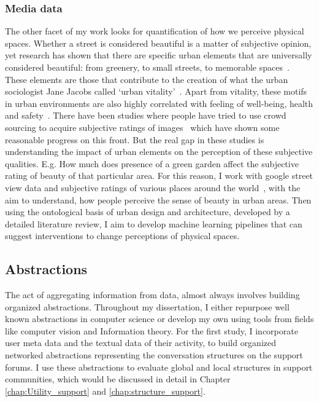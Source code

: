 \subsubsection{Media data}
The other facet of my work looks for quantification of how we perceive physical spaces. Whether a street is considered beautiful is a matter of subjective opinion, yet research has shown that there are specific urban elements that are universally considered beautiful: from greenery, to small streets, to memorable spaces~\cite{alexander1977pattern, quercia2014aesthetic,salesses2013collaborative}. These elements are those that contribute to the creation of what the urban sociologist Jane Jacobs called `urban vitality'~\cite{jacobs1961death}. Apart from vitality, these motifs in urban environments are also highly correlated with feeling of well-being, health and safety~\cite{kaplan1989experience}. There have been studies where people have tried to use crowd sourcing to acquire subjective ratings of images~\cite{seresinhe2015quantifying} which have shown some reasonable progress on this front. But the real gap in these studies is understanding the impact of urban elements on the perception of these subjective qualities. E.g. How much does presence of a green garden affect the subjective rating of beauty of that particular area. For this reason, I work with google street view data and subjective ratings of various places around the world~\cite{naik2014streetscore}, with the aim to understand,  how people perceive the sense of beauty in urban areas. Then using the ontological basis of urban design and architecture, developed by a detailed literature review, I aim to develop machine learning pipelines that can suggest interventions to change perceptions of physical spaces.

\subsection{Abstractions}
The act of aggregating information from data, almost always involves building organized abstractions. Throughout my dissertation, I either repurpose well known abstractions in computer science or develop my own using tools from fields like computer vision and Information theory. For the first study, I incorporate user meta data and the textual data of their activity, to build organized networked abstractions representing the conversation structures on the support forums. I use these abstractions to evaluate global and local structures in support communities, which would be discussed in detail in Chapter \ref{chap:Utility_support} and \ref{chap:structure_support}. 
  
